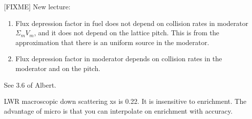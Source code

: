 \documentclass{school-22.211-notes}
\begin{document}
[FIXME] New lecture: 
\begin{enumerate}
\item Flux depression factor in fuel does not depend on collision rates in moderator $\Sigma_m V_m$, and it does not depend on the lattice pitch. This is from the approximation that there is an uniform source in the moderator. 

\item Flux depression factor in moderator depends on collision rates in the moderator and on the pitch. 

\end{enumerate}

See 3.6 of Albert. 

LWR macroscopic down scattering xs is 0.22. It is insensitive to enrichment. The advantage of micro is that you can interpolate on enrichment with accuracy. 

\clearpage
\end{document}
